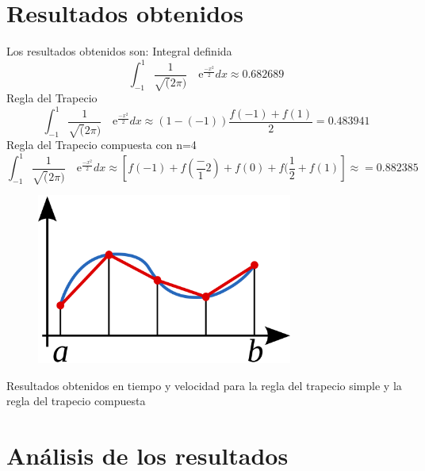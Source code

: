 \section{Resultados obtenidos}
\label{3:sec:3}
\parindent=1cm
\raggedright
Los resultados obtenidos son:
Integral definida 
\[
\int_{-1}^{1} \frac{1}{\sqrt(2\pi)} \quad\text{e}^{\frac{-x^2}{2}}dx\approx0.682689 
\]
Regla del Trapecio
\[
\int_{-1}^{1} \frac{1}{\sqrt(2\pi)} \quad\text{e}^{\frac{-x^2}{2}}dx\approx\left(1-(-1)\right)\frac{f(-1)+f(1)}{2}=0.483941
\]
Regla del Trapecio compuesta con n=4
\[
\int_{-1}^{1} \frac{1}{\sqrt(2\pi)} \quad\text{e}^{\frac{-x^2}{2}}dx\approx\left[f(-1) + f(\frac-{1}{2}) + f(0) + f(\frac{1}{2} + f(1)\right]\approx=0.882385
\]
\begin{figure}[!th]
\begin{center}
\includegraphics[width=0.75\textwidth]{images/Regla-Trap-compuesta.eps}
\label{fig:1}
\end{center}
\end{figure}
Resultados obtenidos en tiempo y velocidad para la regla del trapecio simple y la regla del trapecio compuesta


\section{Análisis de los resultados}
\label{3:sec:4}
\parindent=1cm
\raggedright
 

